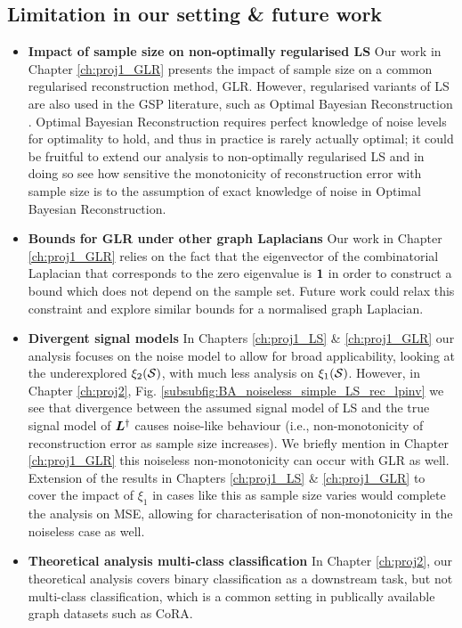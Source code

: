 \subsection{Limitation in our setting \& future work}
\begin{itemize}
    \item \textbf{Impact of sample size on non-optimally regularised LS} Our work in Chapter \ref{ch:proj1_GLR} presents the impact of sample size on a common regularised reconstruction method, GLR. However, regularised variants of LS are also used in the GSP literature, such as Optimal Bayesian Reconstruction \cite{chamon2017greedy,li2024finding}. Optimal Bayesian Reconstruction requires perfect knowledge of noise levels for optimality to hold, and thus in practice is rarely actually optimal; it could be fruitful to extend our analysis to non-optimally regularised LS and in doing so see how sensitive the monotonicity of reconstruction error with sample size is to the assumption of exact knowledge of noise in Optimal Bayesian Reconstruction.
    \item \textbf{Bounds for GLR under other graph Laplacians} Our work in Chapter \ref{ch:proj1_GLR} relies on the fact that the eigenvector of the combinatorial Laplacian that corresponds to the zero eigenvalue is $\bm{1}$ in order to construct a bound which does not depend on the sample set. Future work could relax this constraint and explore similar bounds for a normalised graph Laplacian.
    \item \textbf{Divergent signal models} In Chapters \ref{ch:proj1_LS} \& \ref{ch:proj1_GLR} our analysis focuses on the noise model to allow for broad applicability, looking at the underexplored $\xi_{2}(\mathcal{S})$, with much less analysis on $\xi_{1}(\mathcal{S})$. However, in Chapter \ref{ch:proj2}, Fig. \ref{subsubfig:BA_noiseless_simple_LS_rec_lpinv} we see that divergence between the assumed signal model of LS and the true signal model of $\bm{L}^{\dagger}$ causes noise-like behaviour (i.e., non-monotonicity of reconstruction error as sample size increases). We briefly mention in Chapter \ref{ch:proj1_GLR} this noiseless non-monotonicity can occur with GLR as well. Extension of the results in Chapters \ref{ch:proj1_LS} \& \ref{ch:proj1_GLR} to cover the impact of $\xi_{1}$ in cases like this as sample size varies would complete the analysis on MSE, allowing for characterisation of non-monotonicity in the noiseless case as well.
    \item \textbf{Theoretical analysis multi-class classification} In Chapter \ref{ch:proj2}, our theoretical analysis covers binary classification as a downstream task, but not multi-class classification, which is a common setting in publically available graph datasets such as CoRA.

\end{itemize}
